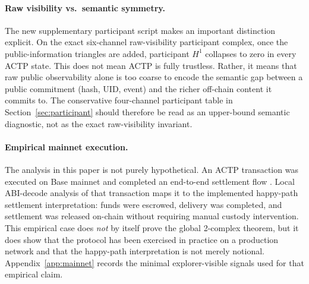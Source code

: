 \documentclass[11pt]{article}
\theoremstyle{plain}
\theoremstyle{definition}
\newcommand{\Hone}{H^{1}}
\begin{document}
\paragraph{Raw visibility vs.\ semantic symmetry.}
The new supplementary participant script makes an important distinction
explicit.  On the exact six-channel raw-visibility participant complex, once
the public-information triangles are added, participant $\Hone$ collapses to
zero in every ACTP state.  This does not mean ACTP is fully trustless.
Rather, it means that raw public observability alone is too coarse to encode
the semantic gap between a public commitment (hash, UID, event) and the richer
off-chain content it commits to.  The conservative four-channel participant
table in Section~\ref{sec:participant} should therefore be read as an
upper-bound semantic diagnostic, not as the exact raw-visibility invariant.

\paragraph{Empirical mainnet execution.}
The analysis in this paper is not purely hypothetical.  An ACTP transaction
was executed on Base mainnet and completed an end-to-end settlement flow
\cite{ACTPmainnettx}.  Local ABI-decode analysis of that transaction maps it to the
implemented happy-path settlement interpretation: funds were escrowed,
delivery was completed, and settlement was released on-chain without requiring
manual custody intervention.  This empirical case does \emph{not} by itself
prove the global 2-complex theorem, but it does show that the protocol has
been exercised in practice on a production network and that the happy-path
interpretation is not merely notional.  Appendix~\ref{app:mainnet} records the
minimal explorer-visible signals used for that empirical claim.
\end{document}
